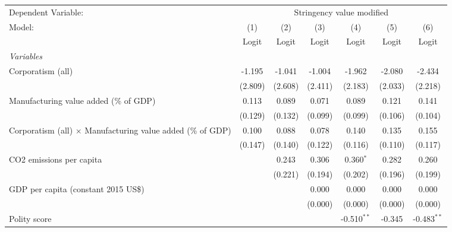 
\begingroup
\centering
\begin{tabular}{lcccccc}
   \toprule
   Dependent Variable: & \multicolumn{6}{c}{Stringency value modified}\\
   Model:                                                             & (1)     & (2)     & (3)     & (4)           & (5)     & (6)\\  
                                                                      &  Logit  & Logit   & Logit   & Logit         & Logit   & Logit\\  
   \midrule
   \emph{Variables}\\
   Corporatism (all)                                                  & -1.195  & -1.041  & -1.004  & -1.962        & -2.080  & -2.434\\   
                                                                      & (2.809) & (2.608) & (2.411) & (2.183)       & (2.033) & (2.218)\\   
   Manufacturing value added (\% of GDP)                              & 0.113   & 0.089   & 0.071   & 0.089         & 0.121   & 0.141\\   
                                                                      & (0.129) & (0.132) & (0.099) & (0.099)       & (0.106) & (0.104)\\   
   Corporatism (all) $\times$ Manufacturing value added (\% of GDP)   & 0.100   & 0.088   & 0.078   & 0.140         & 0.135   & 0.155\\   
                                                                      & (0.147) & (0.140) & (0.122) & (0.116)       & (0.110) & (0.117)\\   
   CO2 emissions per capita                                           &         & 0.243   & 0.306   & 0.360$^{*}$   & 0.282   & 0.260\\   
                                                                      &         & (0.221) & (0.194) & (0.202)       & (0.196) & (0.199)\\   
   GDP per capita (constant 2015 US\$)                                &         &         & 0.000   & 0.000         & 0.000   & 0.000\\   
                                                                      &         &         & (0.000) & (0.000)       & (0.000) & (0.000)\\   
   Polity score                                                       &         &         &         & -0.510$^{**}$ & -0.345  & -0.483$^{**}$\\   

\end{tabular}

